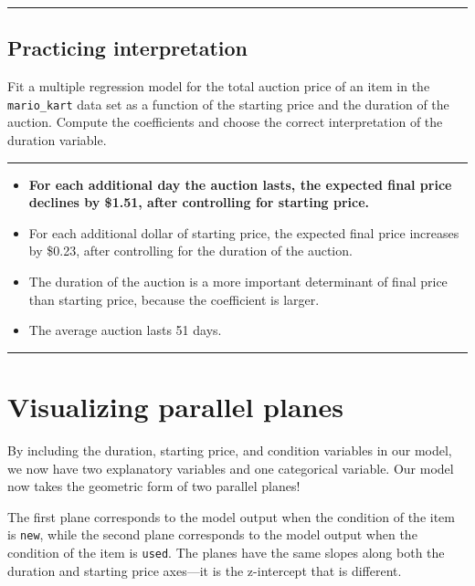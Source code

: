 \documentclass[]{book}
\begin{document}
\begin{center}\rule{0.5\linewidth}{\linethickness}\end{center}

\subsection*{Practicing interpretation}\label{practicing-interpretation}

Fit a multiple regression model for the total auction price of an item
in the \texttt{mario\_kart} data set as a function of the starting price
and the duration of the auction. Compute the coefficients and choose the
correct interpretation of the duration variable.

\begin{center}\rule{0.5\linewidth}{\linethickness}\end{center}

\begin{itemize}
\item
  \textbf{For each additional day the auction lasts, the expected final
  price declines by \$1.51, after controlling for starting price.}
\item
  For each additional dollar of starting price, the expected final price
  increases by \$0.23, after controlling for the duration of the
  auction.
\item
  The duration of the auction is a more important determinant of final
  price than starting price, because the coefficient is larger.
\item
  The average auction lasts 51 days.
\end{itemize}

\begin{center}\rule{0.5\linewidth}{\linethickness}\end{center}

\section{Visualizing parallel planes}\label{visualizing-parallel-planes}

By including the duration, starting price, and condition variables in
our model, we now have two explanatory variables and one categorical
variable. Our model now takes the geometric form of two parallel planes!

The first plane corresponds to the model output when the condition of
the item is \texttt{new}, while the second plane corresponds to the
model output when the condition of the item is \texttt{used}. The planes
have the same slopes along both the duration and starting price
axes---it is the z-intercept that is different.
\end{document}
